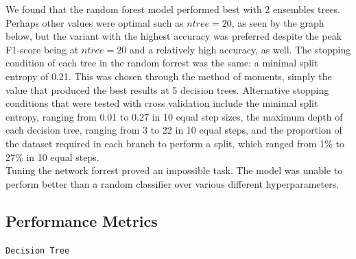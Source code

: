 \documentclass{article}
\begin{document}
We found that the random forest model performed best with 2 ensembles trees. Perhaps other values were optimal such as $ntree = 20$, as seen by the graph below, but
the variant with the highest accuracy was preferred despite the peak F1-score being at $ntree=20$ and a relatively high accuracy, as well.
The stopping condition of each tree in the random forrest was the same: a minimal split entropy of 0.21. This was chosen through the method of moments, simply the value that produced the best results at 5 decision trees.
Alternative stopping conditions that were tested with cross validation include the minimal split entropy, ranging from 0.01 to 0.27 in 10 equal step sizes, the maximum depth of each decision tree, ranging from 3 to 22 in 10 equal steps,
and the proportion of the dataset required in each branch to perform a split, which ranged from 1\% to 27\% in 10 equal steps.
\\

Tuning the network forrest proved an impossible task. The model was unable to perform better than a random classifier over various different hyperparameters.

\subsection*{Performance Metrics}
\begin{center}
    \texttt{Decision Tree}
\end{center}
\end{document}

